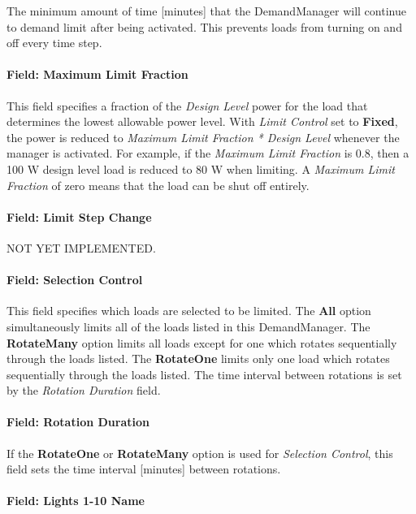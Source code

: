 The minimum amount of time {[}minutes{]} that the DemandManager will continue to demand limit after being activated. This prevents loads from turning on and off every time step.

\paragraph{Field: Maximum Limit Fraction}\label{field-maximum-limit-fraction-1}

This field specifies a fraction of the \emph{Design Level} power for the load that determines the lowest allowable power level. With \emph{Limit Control} set to \textbf{Fixed}, the power is reduced to \emph{Maximum Limit Fraction * Design Level} whenever the manager is activated. For example, if the \emph{Maximum Limit Fraction} is 0.8, then a 100 W design level load is reduced to 80 W when limiting. A \emph{Maximum Limit Fraction} of zero means that the load can be shut off entirely.

\paragraph{Field: Limit Step Change}\label{field-limit-step-change-1}

NOT YET IMPLEMENTED.

\paragraph{Field: Selection Control}\label{field-selection-control-1}

This field specifies which loads are selected to be limited. The \textbf{All} option simultaneously limits all of the loads listed in this DemandManager. The \textbf{RotateMany} option limits all loads except for one which rotates sequentially through the loads listed. The \textbf{RotateOne} limits only one load which rotates sequentially through the loads listed. The time interval between rotations is set by the \emph{Rotation Duration} field.

\paragraph{Field: Rotation Duration}\label{field-rotation-duration-1}

If the \textbf{RotateOne} or \textbf{RotateMany} option is used for \emph{Selection Control}, this field sets the time interval {[}minutes{]} between rotations.

\paragraph{Field: Lights 1-10 Name}\label{field-lights-1-10-name}

